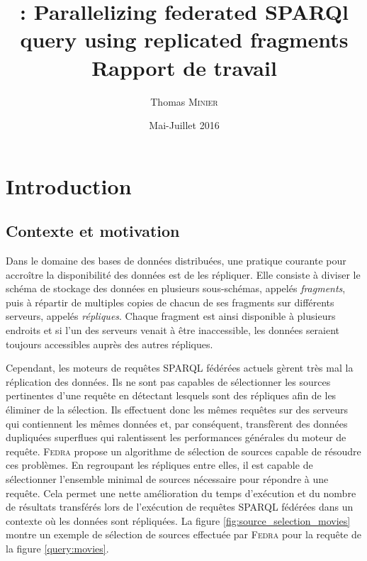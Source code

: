 \documentclass[a4paper]{article}
\title{\peneloop : Parallelizing federated SPARQl query using replicated fragments\\Rapport de travail}
\author{Thomas \textsc{Minier}}
\date{Mai-Juillet 2016}
\def\fedra{\textsc{Fedra}\xspace}
\begin{document}
\maketitle

\tableofcontents

\newpage

\section{Introduction}

\subsection{Contexte et motivation}

Dans le domaine des bases de données distribuées, une pratique courante pour accroître la disponibilité des données est de les répliquer. Elle consiste à diviser le schéma de stockage des données en plusieurs sous-schémas, appelés \textit{fragments}, puis à répartir de multiples copies de chacun de ses fragments sur différents serveurs, appelés \textit{répliques}. Chaque fragment est ainsi disponible à plusieurs endroits et si l'un des serveurs venait à être inaccessible, les données seraient toujours accessibles auprès des autres répliques.

Cependant, les moteurs de requêtes SPARQL fédérées actuels \cite{schwarte2011fedx,acosta2011anapsid} gèrent très mal la réplication des données. Ils ne sont pas capables de sélectionner les sources pertinentes d'une requête en détectant lesquels sont des répliques afin de les éliminer de la sélection. Ils effectuent donc les mêmes requêtes sur des serveurs qui contiennent les mêmes données et, par conséquent, transfèrent des données dupliquées superflues qui ralentissent les performances générales du moteur de requête. \fedra \cite{montoya2014fedra} propose un algorithme de sélection de sources capable de résoudre ces problèmes. En regroupant les répliques entre elles, il est capable de sélectionner l'ensemble minimal de sources nécessaire pour répondre à une requête. Cela permet une nette amélioration du temps d'exécution et du nombre de résultats transférés lors de l'exécution de requêtes SPARQL fédérées dans un contexte où les données sont répliquées. La figure \ref{fig:source_selection_movies} montre un exemple de sélection de sources effectuée par \fedra pour la requête de la figure \ref{query:movies}.


\end{document}
